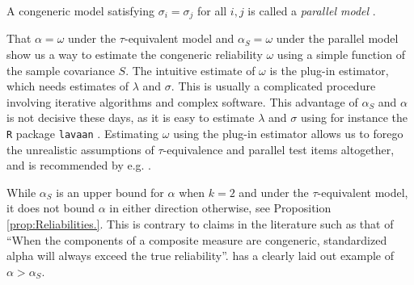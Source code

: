 \documentclass[twoside]{article}
\begin{document}
A congeneric model satisfying $\sigma_{i}=\sigma_{j}$ for all $i,j$ is called a \textit{parallel model} \citep[][section 2.13]{Lord1968-ax}. 

That $\alpha = \omega$ under the $\tau$-equivalent model and $\alpha_S = \omega$ under the parallel model show us a way to estimate the congeneric reliability $\omega$ using a simple function of the sample covariance $S$. The intuitive estimate of $\omega$ is the plug-in estimator, which needs estimates of $\lambda$ and $\sigma$. This is usually a complicated procedure involving iterative algorithms and complex software. This advantage of $\alpha_S$ and $\alpha$ is not decisive these days, as it is easy to estimate $\lambda$ and $\sigma$ using for instance the \texttt{R} \citep{Team2013-tt} package \texttt{lavaan} \citep{Rosseel2012-yg}. Estimating $\omega$ using the plug-in estimator allows us to forego the unrealistic assumptions of $\tau$-equivalence and parallel test items altogether, and is recommended by e.g. \citet{McNeish2019-ea}.

\begin{rem}
While $\alpha_S$ is an upper bound for $\alpha$ when $k = 2$ and under the $\tau$-equivalent model, it does not bound $\alpha$ in either direction otherwise, see Proposition \ref{prop:Reliabilities.}. This is contrary to claims in the literature such as that of \citet[][p.348]{Osburn2000-jd} \enquote{When the components of a composite measure are congeneric, standardized alpha will always exceed the true reliability}. \citet[][p.450]{Falk2011-ae} has a clearly laid out example of $\alpha>\alpha_S$.
\end{rem}
\end{document}
